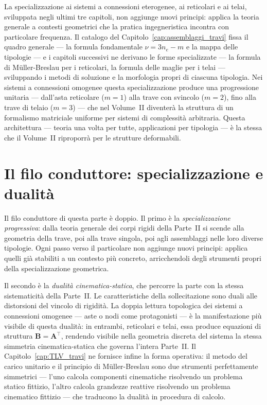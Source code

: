 La specializzazione ai sistemi a connessioni eterogenee, ai reticolari e 
ai telai, sviluppata negli ultimi tre capitoli, non aggiunge nuovi 
principi: applica la teoria generale a contesti geometrici che la 
pratica ingegneristica incontra con particolare frequenza. Il catalogo 
del Capitolo~\ref{cap:assemblaggi_travi} fissa il quadro generale --- 
la formula fondamentale $\nu = 3n_e - m$ e la mappa delle tipologie ---
e i capitoli successivi ne derivano le forme specializzate 
--- la formula di Müller-Breslau per i reticolari, la formula delle 
maglie per i telai --- sviluppando i metodi di soluzione e la 
morfologia propri di ciascuna tipologia. Nei sistemi a connessioni 
omogenee questa specializzazione produce una progressione unitaria --- 
dall'asta reticolare ($m=1$) alla trave con svincolo ($m=2$), fino alla 
trave di telaio ($m=3$) --- che nel Volume~II diventerà la struttura 
di un formalismo matriciale uniforme per sistemi di complessità 
arbitraria. Questa architettura --- teoria una volta per tutte, 
applicazioni per tipologia --- è la stessa che il Volume~II riproporrà 
per le strutture deformabili.


\section*{Il filo conduttore: specializzazione e dualità}

Il filo conduttore di questa parte è doppio. Il primo è la \emph{specializzazione
	progressiva}: dalla teoria generale dei corpi rigidi della Parte~II si scende alla
geometria della trave, poi alla trave singola, poi agli assemblaggi nelle loro diverse
tipologie. Ogni passo verso il particolare non aggiunge nuovi principi: applica quelli
già stabiliti a un contesto più concreto, arricchendoli degli strumenti propri della
specializzazione geometrica.

Il secondo è la \emph{dualità cinematica-statica}, che percorre la parte con la stessa
sistematicità della Parte~II. Le caratteristiche della sollecitazione sono duali alle
distorsioni del vincolo di rigidità. La doppia lettura topologica dei sistemi a
connessioni omogenee --- aste o nodi come protagonisti --- è la manifestazione più
visibile di questa dualità: in entrambi, reticolari e telai, essa produce equazioni
di struttura $\bm{B} = \bm{A}^\top$, rendendo visibile nella geometria discreta del
sistema la stessa simmetria cinematica-statica che governa l'intera Parte~II. Il
Capitolo~\ref{cap:TLV_travi} ne fornisce infine la forma operativa: il metodo del
carico unitario e il principio di Müller-Breslau sono due strumenti perfettamente
simmetrici --- l'uno calcola componenti cinematiche risolvendo un problema statico
fittizio, l'altro calcola grandezze reattive risolvendo un problema cinematico
fittizio --- che traducono la dualità in procedura di calcolo.

